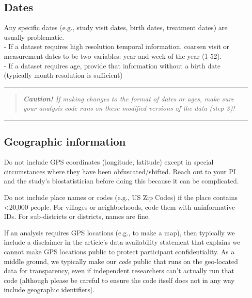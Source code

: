 \documentclass[
]{book}
\begin{document}
\subsection{Dates}\label{dates}

Any specific dates (e.g., study visit dates, birth dates, treatment dates) are usually problematic.\\
- If a dataset requires high resolution temporal information, coarsen visit or measurement dates to be two variables: year and week of the year (1-52).\\
- If a dataset requires age, provide that information without a birth date (typically month resolution is sufficient)

\begin{center}\rule{0.5\linewidth}{0.5pt}\end{center}

\begin{quote}
\emph{\textbf{Caution!} If making changes to the format of dates or ages, make sure your analysis code runs on these modified versions of the data (step 3)! }
\end{quote}

\begin{center}\rule{0.5\linewidth}{0.5pt}\end{center}

\subsection{Geographic information}\label{geographic-information}

Do not include GPS coordinates (longitude, latitude) except in special circumstances where they have been obfuscated/shifted. Reach out to your PI and the study's biostatistician before doing this because it can be complicated.

Do not include place names or codes (e.g., US Zip Codes) if the place contains \textless20,000 people. For villages or neighborhoods, code them with uninformative IDs. For sub-districts or districts, names are fine.

If an analysis requires GPS locations (e.g., to make a map), then typically we include a disclaimer in the article's data availability statement that explains we cannot make GPS locations public to protect participant confidentiality. As a middle ground, we typically make our \emph{code} public that runs on the geo-located data for transparency, even if independent researchers can't actually run that code (although please be careful to ensure the code itself does not in any way include geographic identifiers).
\end{document}
